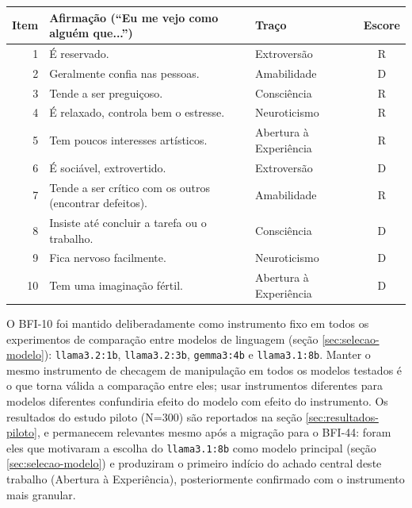 \begin{quadro}[htbp]
    \caption{Itens do BFI-10}
    \label{quadro:bfi10-itens}
    \centering
    \small
    \begin{tabular}{rp{7.2cm}lc}
        \toprule
        Item & Afirmação (``Eu me vejo como alguém que...'') & Traço & Escore \\
        \midrule
        1  & É reservado. & Extroversão & R \\
        2  & Geralmente confia nas pessoas. & Amabilidade & D \\
        3  & Tende a ser preguiçoso. & Consciência & R \\
        4  & É relaxado, controla bem o estresse. & Neuroticismo & R \\
        5  & Tem poucos interesses artísticos. & Abertura à Experiência & R \\
        6  & É sociável, extrovertido. & Extroversão & D \\
        7  & Tende a ser crítico com os outros (encontrar defeitos). & Amabilidade & R \\
        8  & Insiste até concluir a tarefa ou o trabalho. & Consciência & D \\
        9  & Fica nervoso facilmente. & Neuroticismo & D \\
        10 & Tem uma imaginação fértil. & Abertura à Experiência & D \\
        \bottomrule
    \end{tabular}
\end{quadro}

O BFI-10 foi mantido deliberadamente como instrumento fixo em todos os
experimentos de comparação entre modelos de linguagem (seção
\ref{sec:selecao-modelo}): \texttt{llama3.2:1b}, \texttt{llama3.2:3b},
\texttt{gemma3:4b} e \texttt{llama3.1:8b}. Manter o mesmo instrumento de checagem
de manipulação em todos os modelos testados é o que torna válida a
comparação entre eles; usar instrumentos diferentes para modelos diferentes
confundiria efeito do modelo com efeito do instrumento. Os resultados do
estudo piloto (N=300) são
reportados na seção \ref{sec:resultados-piloto}, e permanecem relevantes
mesmo após a migração para o BFI-44: foram eles que motivaram a escolha do
\texttt{llama3.1:8b} como modelo principal (seção
\ref{sec:selecao-modelo}) e produziram o primeiro indício do achado
central deste trabalho (Abertura à Experiência), posteriormente
confirmado com o instrumento mais granular.

